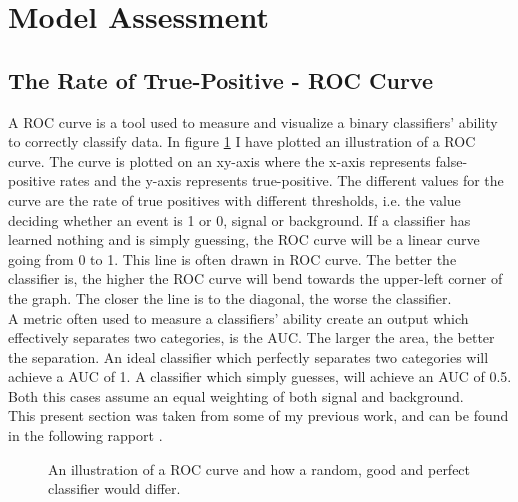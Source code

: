 \section{Model Assessment}\label{subsec:Cost}
\subsection{The Rate of True-Positive - ROC Curve}\label{subsec:AUC}
A \ac{ROC} curve is a tool used to measure and visualize a binary classifiers' ability 
to correctly classify data. In figure \ref{fig:ROC} I have plotted an illustration of a 
\ac{ROC} curve. The curve is plotted on an xy-axis where the x-axis represents 
false-positive rates and the y-axis represents true-positive. The different values 
for the curve are the rate of true positives with different thresholds, i.e. 
the value deciding whether an event is 1 or 0, signal or background. If a classifier 
has learned nothing and is simply guessing, the \ac{ROC} curve will be a linear curve 
going from 0 to 1. This line is often drawn in \ac{ROC} curve. The better the 
classifier is, the higher the \ac{ROC} curve will bend towards the upper-left corner of the 
graph. The closer the line is to the diagonal, the worse the classifier. 
\\
A metric often used to measure a classifiers' ability create an output which effectively 
separates two categories, is the \ac{AUC}. The larger the area, the better the separation. 
An ideal classifier which perfectly separates two categories will achieve a \ac{AUC} of 1.
A classifier which simply guesses, will achieve an \ac{AUC} of 0.5. Both this cases assume 
an equal weighting of both signal and background. 
\\
This present section was taken from some of my previous work, and can be found in the following 
rapport \cite{HirstFretteML}.
\begin{figure}
    \centering
    \caption{An illustration of a \acs{ROC} curve and how a random, good and perfect classifier would differ.}
    \label{fig:ROC}
\end{figure}
